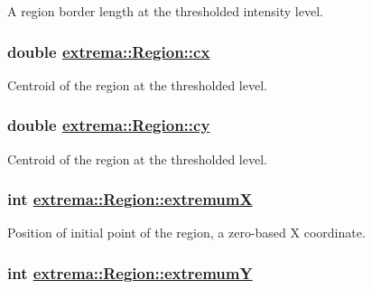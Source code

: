 A region border length at the thresholded intensity level. 

\hypertarget{structextrema_1_1Region_076944542ce47e4c2751fd341f12c2ad}{
\subsubsection[cx]{\setlength{\rightskip}{0pt plus 5cm}double \hyperlink{structextrema_1_1Region_076944542ce47e4c2751fd341f12c2ad}{extrema::Region::cx}}}
\label{structextrema_1_1Region_076944542ce47e4c2751fd341f12c2ad}


Centroid of the region at the thresholded level. 

\hypertarget{structextrema_1_1Region_ef79c517c0945f5b8e56b52b1ceb08ce}{
\subsubsection[cy]{\setlength{\rightskip}{0pt plus 5cm}double \hyperlink{structextrema_1_1Region_ef79c517c0945f5b8e56b52b1ceb08ce}{extrema::Region::cy}}}
\label{structextrema_1_1Region_ef79c517c0945f5b8e56b52b1ceb08ce}


Centroid of the region at the thresholded level. 

\hypertarget{structextrema_1_1Region_0743e8f53fccbbac44a5d2131d371d37}{
\subsubsection[extremumX]{\setlength{\rightskip}{0pt plus 5cm}int \hyperlink{structextrema_1_1Region_0743e8f53fccbbac44a5d2131d371d37}{extrema::Region::extremum\-X}}}
\label{structextrema_1_1Region_0743e8f53fccbbac44a5d2131d371d37}


Position of initial point of the region, a zero-based X coordinate. 

\hypertarget{structextrema_1_1Region_9863f6b21977493df9c7e48ab336e09c}{
\subsubsection[extremumY]{\setlength{\rightskip}{0pt plus 5cm}int \hyperlink{structextrema_1_1Region_9863f6b21977493df9c7e48ab336e09c}{extrema::Region::extremum\-Y}}}
\label{structextrema_1_1Region_9863f6b21977493df9c7e48ab336e09c}


